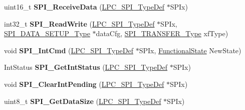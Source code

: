 \begin{DoxyCompactItemize}
\item 
\hypertarget{group___s_p_i___public___functions_gaf9dadfe803c47babc11f6d36fd641ca8}{uint16\-\_\-t {\bfseries \-S\-P\-I\-\_\-\-Receive\-Data} (\hyperlink{struct_l_p_c___s_p_i___type_def}{\-L\-P\-C\-\_\-\-S\-P\-I\-\_\-\-Type\-Def} $\ast$\-S\-P\-Ix)}\label{group___s_p_i___public___functions_gaf9dadfe803c47babc11f6d36fd641ca8}

\item 
\hypertarget{group___s_p_i___public___functions_ga2f278961f5f8a66beea7a0c1c29b1ef2}{int32\-\_\-t {\bfseries \-S\-P\-I\-\_\-\-Read\-Write} (\hyperlink{struct_l_p_c___s_p_i___type_def}{\-L\-P\-C\-\_\-\-S\-P\-I\-\_\-\-Type\-Def} $\ast$\-S\-P\-Ix, \hyperlink{struct_s_p_i___d_a_t_a___s_e_t_u_p___type}{\-S\-P\-I\-\_\-\-D\-A\-T\-A\-\_\-\-S\-E\-T\-U\-P\-\_\-\-Type} $\ast$data\-Cfg, \hyperlink{group___s_p_i___public___types_ga0003ce5a6b4371e13d99dcce3fcada70}{\-S\-P\-I\-\_\-\-T\-R\-A\-N\-S\-F\-E\-R\-\_\-\-Type} xf\-Type)}\label{group___s_p_i___public___functions_ga2f278961f5f8a66beea7a0c1c29b1ef2}

\item 
\hypertarget{group___s_p_i___public___functions_ga8d66b5c9ab5f165f022b4ff05befc3e6}{void {\bfseries \-S\-P\-I\-\_\-\-Int\-Cmd} (\hyperlink{struct_l_p_c___s_p_i___type_def}{\-L\-P\-C\-\_\-\-S\-P\-I\-\_\-\-Type\-Def} $\ast$\-S\-P\-Ix, \hyperlink{group___l_p_c___types___public___types_gac9a7e9a35d2513ec15c3b537aaa4fba1}{\-Functional\-State} \-New\-State)}\label{group___s_p_i___public___functions_ga8d66b5c9ab5f165f022b4ff05befc3e6}

\item 
\hypertarget{group___s_p_i___public___functions_gaf4be2385961757e16c7e039b20eda073}{\-Int\-Status {\bfseries \-S\-P\-I\-\_\-\-Get\-Int\-Status} (\hyperlink{struct_l_p_c___s_p_i___type_def}{\-L\-P\-C\-\_\-\-S\-P\-I\-\_\-\-Type\-Def} $\ast$\-S\-P\-Ix)}\label{group___s_p_i___public___functions_gaf4be2385961757e16c7e039b20eda073}

\item 
\hypertarget{group___s_p_i___public___functions_gaae94eea146da94e4fe484ef2eb5b0658}{void {\bfseries \-S\-P\-I\-\_\-\-Clear\-Int\-Pending} (\hyperlink{struct_l_p_c___s_p_i___type_def}{\-L\-P\-C\-\_\-\-S\-P\-I\-\_\-\-Type\-Def} $\ast$\-S\-P\-Ix)}\label{group___s_p_i___public___functions_gaae94eea146da94e4fe484ef2eb5b0658}

\item 
\hypertarget{group___s_p_i___public___functions_ga01cdc5a3a87f60639723f52637dfa472}{uint8\-\_\-t {\bfseries \-S\-P\-I\-\_\-\-Get\-Data\-Size} (\hyperlink{struct_l_p_c___s_p_i___type_def}{\-L\-P\-C\-\_\-\-S\-P\-I\-\_\-\-Type\-Def} $\ast$\-S\-P\-Ix)}\label{group___s_p_i___public___functions_ga01cdc5a3a87f60639723f52637dfa472}


\end{DoxyCompactItemize}
